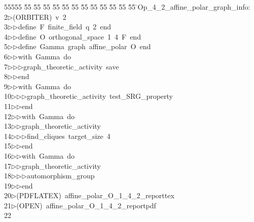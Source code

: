 %
%
\begin{tabbing}
55555 \= 55 \= 55 \= 55 \= 55 \= 55 \= 55 \= 55 \= 55 \= 55 \= 55 \= 55 \= 55 \= \>Op\_4\_2\_affine\_polar\_graph\_info:\\[0pt]
2\>$\triangleright$\>(ORBITER)\ v\ 2\ \\[0pt]
3\>$\triangleright$\>$\triangleright$\>define\ F\ finite\_field\ q\ 2\ end\ \\[0pt]
4\>$\triangleright$\>$\triangleright$\>define\ O\ orthogonal\_space\ 1\ 4\ F\ end\ \\[0pt]
5\>$\triangleright$\>$\triangleright$\>define\ Gamma\ graph\ affine\_polar\ O\ end\ \\[0pt]
6\>$\triangleright$\>$\triangleright$\>with\ Gamma\ do\ \\[0pt]
7\>$\triangleright$\>$\triangleright$\>$\triangleright$\>graph\_theoretic\_activity\ save\ \\[0pt]
8\>$\triangleright$\>$\triangleright$\>end\ \\[0pt]
9\>$\triangleright$\>$\triangleright$\>with\ Gamma\ do\ \\[0pt]
10\>$\triangleright$\>$\triangleright$\>$\triangleright$\>graph\_theoretic\_activity\ test\_SRG\_property\ \\[0pt]
11\>$\triangleright$\>$\triangleright$\>end\ \\[0pt]
12\>$\triangleright$\>$\triangleright$\>with\ Gamma\ do\ \\[0pt]
13\>$\triangleright$\>$\triangleright$\>graph\_theoretic\_activity\ \\[0pt]
14\>$\triangleright$\>$\triangleright$\>$\triangleright$\>find\_cliques\ target\_size\ 4\ \\[0pt]
15\>$\triangleright$\>$\triangleright$\>end\ \\[0pt]
16\>$\triangleright$\>$\triangleright$\>with\ Gamma\ do\ \\[0pt]
17\>$\triangleright$\>$\triangleright$\>graph\_theoretic\_activity\ \\[0pt]
18\>$\triangleright$\>$\triangleright$\>$\triangleright$\>automorphism\_group\ \\[0pt]
19\>$\triangleright$\>$\triangleright$\>end\\[0pt]
20\>$\triangleright$\>(PDFLATEX)\ affine\_polar\_O\_1\_4\_2\_reporttex\\[0pt]
21\>$\triangleright$\>(OPEN)\ affine\_polar\_O\_1\_4\_2\_reportpdf\\[0pt]
22\>\end{tabbing}

